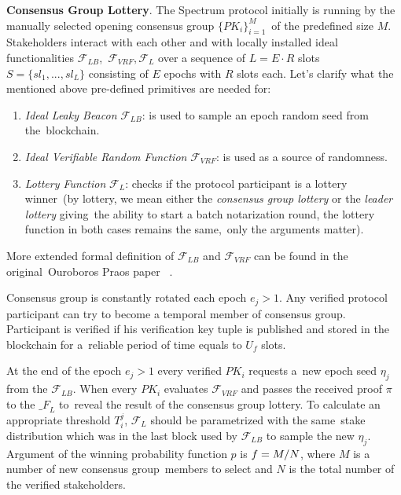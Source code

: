 \textbf{Consensus Group Lottery}.
The Spectrum protocol initially is running by the manually selected opening consensus group $\{PK_i\}_{i=1}^M$\
of the predefined size $M$.
Stakeholders interact with each other and with locally installed ideal functionalities ${\mathcal{F}}_{LB}$,\
${\mathcal{F}}_{VRF}, {\mathcal{F}}_{L}$ over a sequence of $L = E \cdot R$ slots\
${S=\{sl_1,...,sl_L\}}$ consisting of $E$ epochs with $R$ slots each.
Let's clarify what the mentioned above pre-defined primitives are needed for:
\begin{enumerate}
    \item \emph{Ideal Leaky Beacon} ${\mathcal{F}}_{LB}$: is used to sample an epoch random seed from the\
    blockchain.
    \item \emph{Ideal Verifiable Random Function} ${\mathcal{F}}_{VRF}$: is used as a source of randomness.
    \item \emph{Lottery Function} ${\mathcal{F}}_{L}$: checks if the protocol participant is a lottery winner\
    (by lottery, we mean either the \emph{consensus group lottery} or the \emph{leader lottery} giving\
    the ability to start a batch notarization round, the lottery function in both cases remains the same,\
    only the arguments matter).
\end{enumerate}
More extended formal definition of ${\mathcal{F}}_{LB}$ and ${\mathcal{F}}_{VRF}$ can be found in the original\
Ouroboros Praos paper ~\cite{cryptoeprint:2017/573}.

Consensus group is constantly rotated each epoch ${e_j \gt 1}$.
Any verified protocol participant can try to become a temporal member of consensus group.
Participant is verified if his verification key tuple is published and stored in the blockchain for a\
reliable period of time equals to $U_f$ slots.

At the end of the epoch ${e_j \gt 1}$ every verified $PK_i$ requests a\
new epoch seed $\eta_j$ from the ${\mathcal{F}}_{LB}$.
When every $PK_i$ evaluates ${\mathcal{F}}_{VRF}$ and passes the received proof $\pi$ to the ${\mathcal_{F}}_{L}$ to\
reveal the result of the consensus group lottery.
To calculate an appropriate threshold ${T_i^j}$, ${\mathcal{F}}_{L}$ should be parametrized with the same\
stake distribution which was in the last block used by ${\mathcal{F}}_{LB}$ to sample the new $\eta_j$.
Argument of the winning probability function $p$ is ${f = M /\/ N}$, where $M$ is a number of new consensus group\
members to select and $N$ is the total number of the verified stakeholders.

